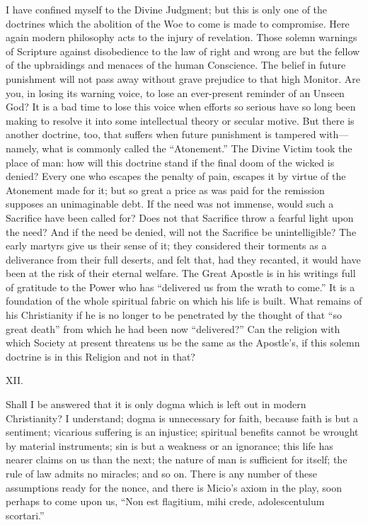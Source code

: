 I have confined myself to the Divine Judgment; but this is only one
of the doctrines which the abolition of the Woe to come is made to
compromise. Here again modern philosophy acts to the injury of
revelation. Those solemn warnings of Scripture against disobedience to
the law of right and wrong are but the fellow of the upbraidings and
menaces of the human Conscience. The belief in future punishment will
not pass away without grave prejudice to that high Monitor. Are you,
in losing its warning voice, to lose an ever-present reminder of an
Unseen God? It is a bad time to lose this voice when efforts so
serious have so long been making to resolve it into some intellectual
theory or secular motive. But there is another doctrine, too, that
suffers when future punishment is tampered with—namely, what is
commonly called the ``Atonement.'' The Divine Victim took the
place of man: how will this doctrine stand if the final doom of the
wicked is denied? Every one who escapes the penalty of pain, escapes
it by virtue of the Atonement made for it; but so great a price as was
paid for the remission supposes an unimaginable debt. If the need was
not immense, would such a Sacrifice have been called for? Does not
that Sacrifice throw a fearful light upon the need? And if the need be
denied, will not the Sacrifice be unintelligible? The early martyrs
give us their sense of it; they considered their torments as a
deliverance from their full deserts, and felt that, had they recanted,
it would have been at the risk of their eternal welfare. The Great
Apostle is in his writings full of gratitude to the Power who has
``delivered us from the wrath to come.'' It is a
foundation of the whole spiritual fabric on which his life is built.
What remains of his Christianity if he is no longer to be penetrated
by the thought of that ``so great death'' from which he had
been now ``delivered?'' Can the religion with which Society at
present threatens us be the same as the Apostle's, if this solemn
doctrine is in this Religion and not in that?

XII.

Shall I be answered that it is only dogma which is left out in
modern Christianity? I understand; dogma is unnecessary for faith,
because faith is but a sentiment; vicarious suffering is an injustice;
spiritual benefits cannot be wrought by material instruments; sin is
but a weakness or an ignorance; this life has nearer claims on us than
the next; the nature of man is sufficient for itself; the rule of law
admits no miracles; and so on. There is any number of these
assumptions ready for the nonce, and there is Micio's axiom in the
play, soon perhaps to come upon us, ``Non est flagitium, mihi
crede, adolescentulum scortari.''


